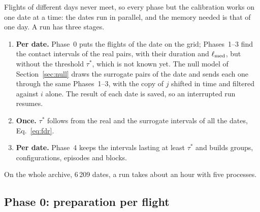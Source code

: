 Flights of different days never meet, so every phase but the calibration works on one date at a
time: the dates run in parallel, and the memory needed is that of one day. A run has three
stages.
\begin{enumerate}
  \item \textbf{Per date.} Phase~0 puts the flights of the date on the grid; Phases~1--3 find the
        contact intervals of the real pairs, with their duration and $\ell_{\rm med}$, but
        without the threshold $\tau^*$, which is not known yet. The null model of
        Section~\ref{sec:null} draws the surrogate pairs of the date and sends each one through
        the same Phases~1--3, with the copy of $j$ shifted in time and filtered against $i$
        alone. The result of each date is saved, so an interrupted run resumes.
  \item \textbf{Once.} $\tau^*$ follows from the real and the surrogate intervals of all the
        dates, Eq.~\eqref{eq:fdr}.
  \item \textbf{Per date.} Phase~4 keeps the intervals lasting at least $\tau^*$ and builds
        groups, configurations, episodes and blocks.
\end{enumerate}
On the whole archive, 6\,209 dates, a run takes about an hour with five processes.

\subsection{Phase 0: preparation per flight}\label{sec:phase0}

